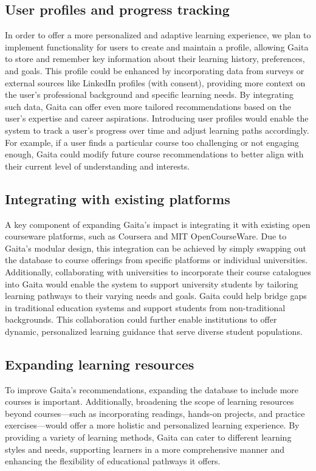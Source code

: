\subsection{User profiles and progress tracking} 

In order to offer a more personalized and adaptive learning experience, we plan to implement functionality for users to create and maintain a profile, allowing Gaita to store and remember key information about their learning history, preferences, and goals. This profile could be enhanced by incorporating data from surveys or external sources like LinkedIn profiles (with consent), providing more context on the user’s professional background and specific learning needs. By integrating such data, Gaita can offer even more tailored recommendations based on the user’s expertise and career aspirations. Introducing user profiles would enable the system to track a user’s progress over time and adjust learning paths accordingly. For example, if a user finds a particular course too challenging or not engaging enough, Gaita could modify future course recommendations to better align with their current level of understanding and interests. 

\subsection{Integrating with existing platforms}

A key component of expanding Gaita’s impact is integrating it with existing open courseware platforms, such as Coursera and MIT OpenCourseWare. Due to Gaita’s modular design, this integration can be achieved by simply swapping out the database to course offerings from specific platforms or individual universities. Additionally, collaborating with universities to incorporate their course catalogues into Gaita would enable the system to support university students by tailoring learning pathways to their varying needs and goals. Gaita could help bridge gaps in traditional education systems and support students from non-traditional backgrounds. This collaboration could further enable institutions to offer dynamic, personalized learning guidance that serve diverse student populations.

\subsection{Expanding learning resources}

To improve Gaita’s recommendations, expanding the database to include more courses is important. Additionally, broadening the scope of learning resources beyond courses—such as incorporating readings, hands-on projects, and practice exercises—would offer a more holistic and personalized learning experience. By providing a variety of learning methods, Gaita can cater to different learning styles and needs, supporting learners in a more comprehensive manner and enhancing the flexibility of educational pathways it offers.

